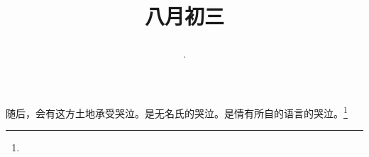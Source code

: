 \title{\date[d=5,m=9,y=2024][year:cn-y,年,month:cn,day:cn,日,·,weekday]·八月初三 }
随后，会有这方土地承受哭泣。是无名氏的哭泣。是情有所自的语言的哭泣。\footnote{ }

